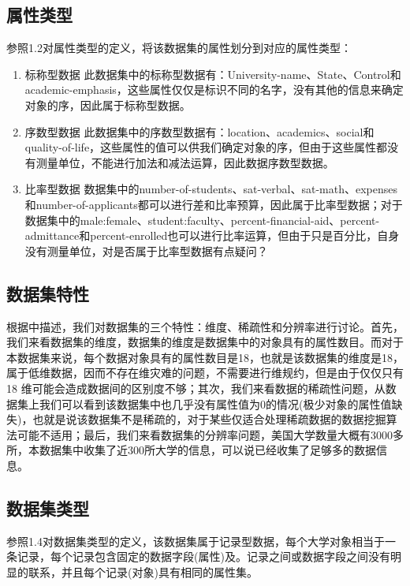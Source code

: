 \documentclass[a4paper, 11pt, hyperref, titlepage]{article}
\newcommand{\hei}[1]{{\HEI #1}}
\begin{document}
\subsection{\hei{属性类型}}
参照1.2对属性类型的定义，将该数据集的属性划分到对应的属性类型：

\begin{enumerate}

    \item 标称型数据 此数据集中的标称型数据有：University-name、State、Control和academic-emphasis，这些属性仅仅是标识不同的名字，没有其他的信息来确定对象的序，因此属于标称型数据。
    \item 序数型数据 此数据集中的序数型数据有：location、academics、social和quality-of-life，这些属性的值可以供我们确定对象的序，但由于这些属性都没有测量单位，不能进行加法和减法运算，因此数据序数型数据。
    \item 比率型数据 数据集中的number-of-students、sat-verbal、sat-math、expenses和number-of-applicants都可以进行差和比率预算，因此属于比率型数据；对于数据集中的male:female、student:faculty、percent-financial-aid、percent-admittance和percent-enrolled也可以进行比率运算，但由于只是百分比，自身没有测量单位，对是否属于比率型数据有点疑问？

\end{enumerate}

\subsection{\hei{数据集特性}}
根据\cite{FanMing2006}中描述，我们对数据集的三个特性：维度、稀疏性和分辨率进行讨论。首先，我们来看数据集的维度，数据集的维度是数据集中的对象具有的属性数目。而对于本数据集来说，每个数据对象具有的属性数目是18，也就是该数据集的维度是18，属于低维数据，因而不存在维灾难的问题，不需要进行维规约，但是由于仅仅只有18 维可能会造成数据间的区别度不够；其次，我们来看数据的稀疏性问题，从数据集上我们可以看到该数据集中也几乎没有属性值为0的情况(极少对象的属性值缺失)，也就是说该数据集不是稀疏的，对于某些仅适合处理稀疏数据的数据挖掘算法可能不适用；最后，我们来看数据集的分辨率问题，美国大学数量大概有3000多所，本数据集中收集了近300所大学的信息，可以说已经收集了足够多的数据信息。

\subsection{\hei{数据集类型}}
参照1.4对数据集类型的定义，该数据集属于记录型数据，每个大学对象相当于一条记录，每个记录包含固定的数据字段(属性)及。记录之间或数据字段之间没有明显的联系，并且每个记录(对象)具有相同的属性集。





\end{document}
